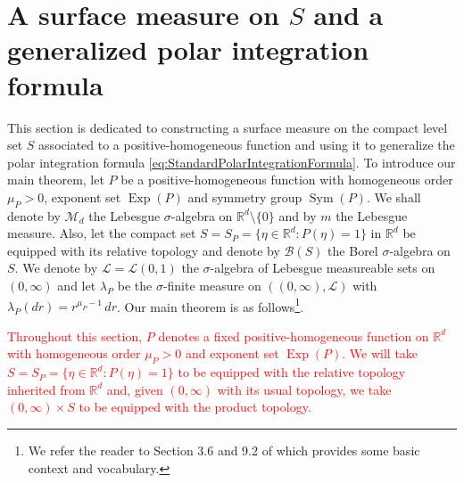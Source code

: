 \documentclass[11pt]{article}
\theoremstyle{remark}
\newcommand\Sym{\operatorname{Sym}}
\newcommand\Exp{\operatorname{Exp}}
\begin{document}
\section{A surface measure on $S$ and a generalized polar integration formula}\label{sec:IntegrationFormula}

This section is dedicated to constructing a surface measure on the compact level set $S$ associated to a positive-homogeneous function and using it to generalize the polar integration formula \eqref{eq:StandardPolarIntegrationFormula}. To introduce our main theorem, let $P$ be a positive-homogeneous function with homogeneous order $\mu_P>0$, exponent set $\Exp(P)$ and symmetry group $\Sym(P)$. We shall denote by $\mathcal{M}_d$ the Lebesgue $\sigma$-algebra on $\mathbb{R}^d\setminus\{0\}$ and by $m$ the Lebesgue measure.  Also, let the compact set $S=S_P=\{\eta\in\mathbb{R}^d:P(\eta)=1\}$ in $\mathbb{R}^d$ be equipped with its relative topology and denote by $\mathcal{B}(S)$ the Borel $\sigma$-algebra on $S$. We denote by $\mathcal{L}=\mathcal{L}(0,1)$ the $\sigma$-algebra of Lebesgue measureable sets on $(0,\infty)$ and let $\lambda_P$ be the $\sigma$-finite measure on $((0,\infty),\mathcal{L})$ with $\lambda_P(dr)=r^{\mu_P-1}\,dr$. Our main theorem is as follows\footnote{We refer the reader to Section 3.6 and 9.2 of \cite{Bogachev2007} which provides some basic context and vocabulary.}. 

\textcolor{red}{\noindent Throughout this section, $P$ denotes a fixed positive-homogeneous function on $\mathbb{R}^d$ with homogeneous order $\mu_P>0$ and exponent set $\Exp(P)$. We will take $S=S_P=\{\eta\in\mathbb{R}^d:P(\eta)=1\}$ to be equipped with the relative topology inherited from $\mathbb{R}^d$ and, given $(0,\infty)$ with its usual topology, we take $(0,\infty)\times S$ to be equipped with the product topology. }
\end{document}
